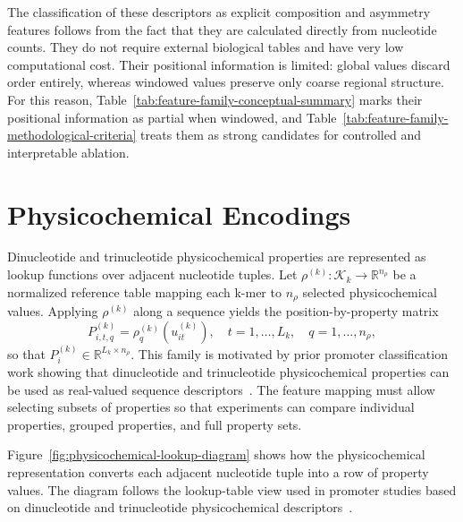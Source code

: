The classification of these descriptors as explicit composition and asymmetry features follows from the fact that they are calculated directly from nucleotide counts. They do not require external biological tables and have very low computational cost. Their positional information is limited: global values discard order entirely, whereas windowed values preserve only coarse regional structure. For this reason, Table~\ref{tab:feature-family-conceptual-summary} marks their positional information as partial when windowed, and Table~\ref{tab:feature-family-methodological-criteria} treats them as strong candidates for controlled and interpretable ablation.

\section{Physicochemical Encodings}\label{sec:features-physicochemical}

Dinucleotide and trinucleotide physicochemical properties are represented as lookup functions over adjacent nucleotide tuples. Let $\rho^{(k)}:\mathcal{K}_k\rightarrow\mathbb{R}^{n_\rho}$ be a normalized reference table mapping each k-mer to $n_\rho$ selected physicochemical values. Applying $\rho^{(k)}$ along a sequence yields the position-by-property matrix
\begin{equation}
P_{i,t,q}^{(k)}=\rho_q^{(k)}\left(u_{it}^{(k)}\right),
\quad t=1,\ldots,L_k,\quad q=1,\ldots,n_\rho,
\end{equation}
so that $P_i^{(k)}\in\mathbb{R}^{L_k\times n_\rho}$. This family is motivated by prior promoter classification work showing that dinucleotide and trinucleotide physicochemical properties can be used as real-valued sequence descriptors~\citep{moraes2023physicochemical}. The feature mapping must allow selecting subsets of properties so that experiments can compare individual properties, grouped properties, and full property sets.

Figure~\ref{fig:physicochemical-lookup-diagram} shows how the physicochemical representation converts each adjacent nucleotide tuple into a row of property values. The diagram follows the lookup-table view used in promoter studies based on dinucleotide and trinucleotide physicochemical descriptors~\citep{moraes2023physicochemical}.

